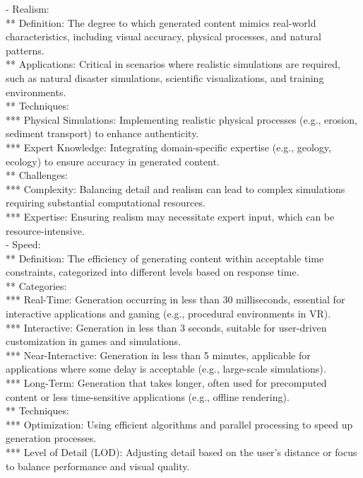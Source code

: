 - Realism: \\
** Definition: The degree to which generated content mimics real-world characteristics, including visual accuracy, physical processes, and natural patterns. \\
** Applications: Critical in scenarios where realistic simulations are required, such as natural disaster simulations, scientific visualizations, and training environments. \\
** Techniques: \\
*** Physical Simulations: Implementing realistic physical processes (e.g., erosion, sediment transport) to enhance authenticity. \\
*** Expert Knowledge: Integrating domain-specific expertise (e.g., geology, ecology) to ensure accuracy in generated content. \\
** Challenges: \\
*** Complexity: Balancing detail and realism can lead to complex simulations requiring substantial computational resources. \\
*** Expertise: Ensuring realism may necessitate expert input, which can be resource-intensive. \\
- Speed: \\
** Definition: The efficiency of generating content within acceptable time constraints, categorized into different levels based on response time. \\
** Categories: \\
*** Real-Time: Generation occurring in less than 30 milliseconds, essential for interactive applications and gaming (e.g., procedural environments in VR). \\
*** Interactive: Generation in less than 3 seconds, suitable for user-driven customization in games and simulations. \\
*** Near-Interactive: Generation in less than 5 minutes, applicable for applications where some delay is acceptable (e.g., large-scale simulations). \\
*** Long-Term: Generation that takes longer, often used for precomputed content or less time-sensitive applications (e.g., offline rendering). \\
** Techniques: \\
*** Optimization: Using efficient algorithms and parallel processing to speed up generation processes. \\
*** Level of Detail (LOD): Adjusting detail based on the user's distance or focus to balance performance and visual quality. \\
